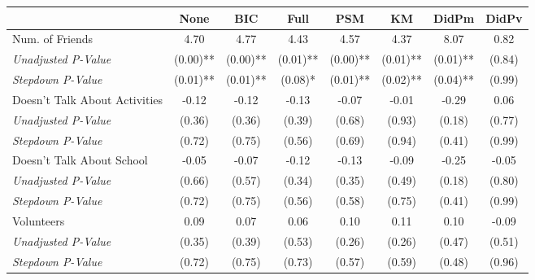 \begin{tabular}{l c c c c c c c}
\toprule
 & None & BIC & Full & PSM & KM & DidPm & DidPv \\
\midrule
Num. of Friends & 4.70 & 4.77 & 4.43 & 4.57 & 4.37 & 8.07 & 0.82 \\
\quad \textit{Unadjusted P-Value} & (0.00)** & (0.00)** & (0.01)** & (0.00)** & (0.01)** & (0.01)** & (0.84) \\
\quad \textit{Stepdown P-Value} & (0.01)** & (0.01)** & (0.08)* & (0.01)** & (0.02)** & (0.04)** & (0.99) \\
Doesn't Talk About Activities & -0.12 & -0.12 & -0.13 & -0.07 & -0.01 & -0.29 & 0.06 \\
\quad \textit{Unadjusted P-Value} & (0.36) & (0.36) & (0.39) & (0.68) & (0.93) & (0.18) & (0.77) \\
\quad \textit{Stepdown P-Value} & (0.72) & (0.75) & (0.56) & (0.69) & (0.94) & (0.41) & (0.99) \\
Doesn't Talk About School & -0.05 & -0.07 & -0.12 & -0.13 & -0.09 & -0.25 & -0.05 \\
\quad \textit{Unadjusted P-Value} & (0.66) & (0.57) & (0.34) & (0.35) & (0.49) & (0.18) & (0.80) \\
\quad \textit{Stepdown P-Value} & (0.72) & (0.75) & (0.56) & (0.58) & (0.75) & (0.41) & (0.99) \\
Volunteers & 0.09 & 0.07 & 0.06 & 0.10 & 0.11 & 0.10 & -0.09 \\
\quad \textit{Unadjusted P-Value} & (0.35) & (0.39) & (0.53) & (0.26) & (0.26) & (0.47) & (0.51) \\
\quad \textit{Stepdown P-Value} & (0.72) & (0.75) & (0.73) & (0.57) & (0.59) & (0.48) & (0.96) \\
\bottomrule
\end{tabular}
